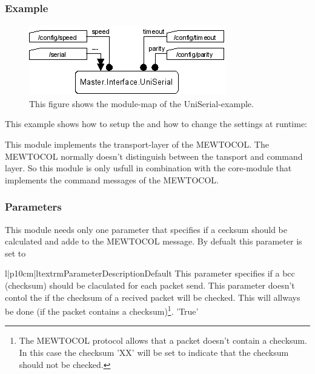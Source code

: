 \subsubsection{Example}
\begin{figure}[ht]
    \label{fig:coremod01}
    \centering
    \includegraphics{coremod01.png}
    \caption{This figure shows the module-map of the UniSerial-example.}
\end{figure}    
This example shows how to setup the  and how to change the 
settings at runtime:













%
%
This module implements the transport-layer of the MEWTOCOL. The MEWTOCOL 
normally doesn't distinguish between the tansport and command layer. So
this module is only usfull in combination with the 
core-module that implements the command messages of the MEWTOCOL.

\subsubsection{Parameters}
This module needs only one parameter that specifies if a cecksum should
be calculated and adde to the MEWTOCOL message. By defualt this parameter
is set to 

\begin{tableiii}{l|p{10cm}|l}{textrm}{Parameter}{Description}{Default}
        {This parameter specifies if a bcc (checksum) should be claculated
         for each packet send. This parameter doesn't contol the if the
         checksum of a recived packet will be checked. This will allways be 
         done (if the packet contains a checksum)\footnote{The MEWTOCOL 
         protocol allows that a packet doesn't contain a checksum. In this 
         case the checksum 'XX' will be set to indicate that the checksum
         should not be checked.}.  
        }{'True'}
\end{tableiii}       

